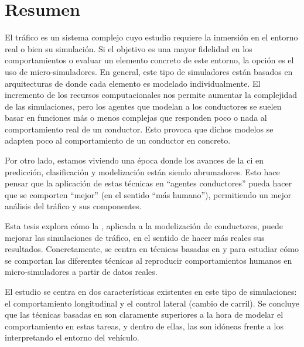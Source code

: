 \cleardoublepage
\thispagestyle{empty}
\chapter*{Resumen}
\begin{fullwidth}
	El tráfico es un sistema complejo cuyo estudio requiere la inmersión en el entorno real o bien su simulación. Si el objetivo es una mayor fidelidad en los comportamientos o evaluar un elemento concreto de este entorno, la opción es el uso de micro-simuladores. En general, este tipo de simuladores están basados en arquitecturas de  donde cada elemento es modelado individualmente. El incremento de los recursos computacionales nos permite aumentar la complejidad de las simulaciones, pero los agentes que modelan a los conductores se suelen basar en funciones más o menos complejas que responden poco o nada al comportamiento real de un conductor. Esto provoca que dichos modelos se adapten poco al comportamiento de un conductor en concreto.
	
	Por otro lado, estamos viviendo una época donde los avances de la \Acrfull{ci} en predicción, clasificación y modelización están siendo abrumadores. Esto hace pensar que la aplicación de estas técnicas en \enquote{agentes conductores} pueda hacer que se comporten \enquote{mejor} (en el sentido \enquote{más humano}), permitiendo un mejor análisis del tráfico y sus componentes.
	
	Esta tesis explora cómo la , aplicada a la modelización de conductores, puede mejorar las simulaciones de tráfico, en el sentido de hacer más reales sus resultados. Concretamente, se centra en técnicas basadas en  y  para estudiar cómo se comportan las diferentes técnicas al reproducir  comportamientos humanos en micro-simuladores a partir de datos reales.
	
	El estudio se centra en dos características existentes en este tipo de simulaciones: el comportamiento longitudinal y el control lateral (cambio de carril). Se concluye que las técnicas basadas en  son claramente superiores a la hora de modelar el comportamiento en estas tareas, y dentro de ellas, las  son idóneas frente a los  interpretando el entorno del vehículo.
	

\end{fullwidth}

